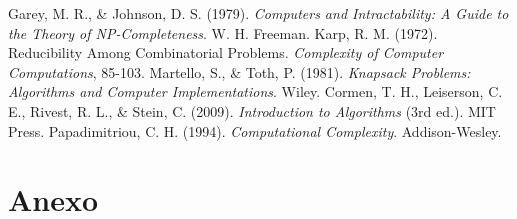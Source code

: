 \documentclass{article}
\begin{document}


\begin{thebibliography}{99}
 Garey, M. R., \& Johnson, D. S. (1979). \textit{Computers and Intractability: A Guide to the Theory of NP-Completeness}. W. H. Freeman.
 Karp, R. M. (1972). Reducibility Among Combinatorial Problems. \textit{Complexity of Computer Computations}, 85-103.
 Martello, S., \& Toth, P. (1981). \textit{Knapsack Problems: Algorithms and Computer Implementations}. Wiley.
 Cormen, T. H., Leiserson, C. E., Rivest, R. L., \& Stein, C. (2009). \textit{Introduction to Algorithms} (3rd ed.). MIT Press.
 Papadimitriou, C. H. (1994). \textit{Computational Complexity}. Addison-Wesley.
\end{thebibliography}

\section{Anexo}
\end{document}
